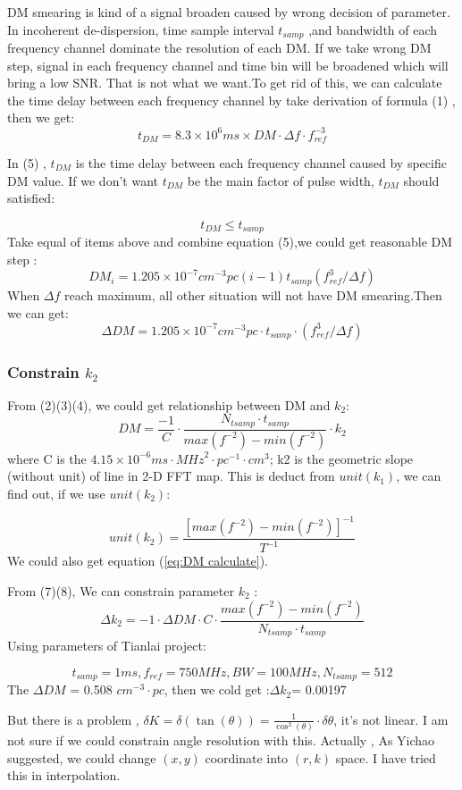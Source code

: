 \documentclass{aastex61}
\begin{document}
DM smearing is kind of a signal broaden caused by wrong decision of parameter. In incoherent de-dispersion, time sample interval $t_{samp}$ ,and bandwidth of each frequency channel dominate the resolution of each DM. If we take wrong DM step, signal in each frequency channel and time bin will be broadened which will bring a low SNR. That is not what we want.To get rid of this, we can calculate the time delay between each frequency channel by take derivation of formula (1) , then we get:
\begin{equation}
t_{DM}=8.3 \times 10^6ms \times DM \cdot \Delta f \cdot f^{-3}_{ref} 
\end{equation}


In (5) , $t_{DM}$ is the time delay between each frequency channel caused by specific DM value. If we don't want  $t_{DM}$ be the main factor of pulse width, $t_{DM}$ should satisfied:

{\centering \[ t_{DM} \leq t_{samp} \]}
Take equal of items above and combine equation (5),we could get  reasonable DM step :
\begin{equation}
DM_i = 1.205 \times 10^{-7} cm^{-3} pc (i-1) t_{samp}(f^3_{ref} / \Delta f)
\end{equation}
When $\Delta f $ reach maximum, all other situation will not have DM smearing.Then we can get:
\begin{equation}
\Delta DM=1.205 \times 10^{-7} cm^{-3} pc\cdot t_{samp}\cdot(f^3_{ref} / \Delta f)
\end{equation}
\subsubsection{Constrain $k_2$}
From (2)(3)(4), we could get relationship between DM and $k_2$:
\begin{equation}
DM = \frac{-1}{C}  \cdot\frac{N_{tsamp}\cdot t_{samp}}{max(f^{-2})-min(f^{-2})}\cdot k_2 \label{eq:DM calculate}
\end{equation}
where C is the $4.15 \times 10^{-6} ms \cdot {MHz}^2 \cdot pc^{-1} \cdot cm^3$; k2 is the geometric slope (without unit) of line in 2-D FFT map. This is deduct from $unit(k_1)$, we can find out, if we use $unit(k_2)$:

{\centering \[unit(k_2)=\frac{[max(f^{-2})-min(f^{-2})]^{-1}}{T^{-1}} \]}
We could also get equation (\ref{eq:DM calculate}).
\pagebreak

From (7)(8), We can constrain parameter $k_2$  :
\begin{equation}
\Delta k_2 = -1 \cdot \Delta DM \cdot C \cdot \frac{max(f^{-2})-min(f^{-2})}{N_{tsamp}\cdot t_{samp}}
\end{equation}
Using parameters of Tianlai project:

{\center \[t_{samp} =1 ms, f_{ref}=750 MHz , BW = 100 MHz , N_{tsamp}=512\]}
The $\Delta DM$ = 0.508 $cm^{-3}\cdot pc$, then we cold get :$\Delta k_2$= 0.00197

But there is a problem ,  $\delta K = \delta(\tan(\theta ))=\frac{1}{\cos^2(\theta)} \cdot \delta \theta$, it's not linear. I am not sure if we could constrain angle resolution with this.
Actually , As Yichao suggested, we could change $(x,y)$ coordinate into $(r,k)$  space. I have tried this in interpolation.
\end{document}
